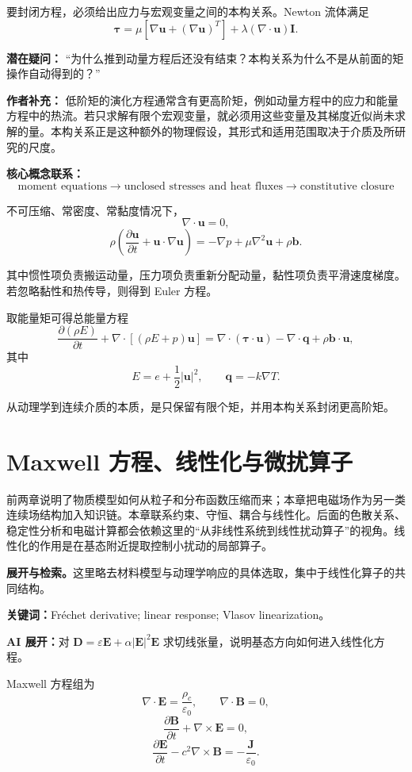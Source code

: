 \documentclass[11pt,openany]{ctexbook}
\newcommand{\studyroute}[3]{%
  \par\smallskip\noindent\textbf{展开与检索。}#1\par
  \noindent\textbf{关键词：}#2。\par
  \noindent\textbf{AI 展开：}#3\par
}
\begin{document}
要封闭方程，必须给出应力与宏观变量之间的本构关系。Newton 流体满足
\[
\bm\tau
=
\mu\left[\nabla\bm u+(\nabla\bm u)^T\right]
+\lambda(\nabla\cdot\bm u)\bm I.
\]

\begin{authornote}
\textbf{潜在疑问：}
“为什么推到动量方程后还没有结束？本构关系为什么不是从前面的矩操作自动得到的？”

\textbf{作者补充：}
低阶矩的演化方程通常含有更高阶矩，例如动量方程中的应力和能量方程中的热流。若只求解有限个宏观变量，就必须用这些变量及其梯度近似尚未求解的量。本构关系正是这种额外的物理假设，其形式和适用范围取决于介质及所研究的尺度。

\textbf{核心概念联系：}
\[
\text{moment equations}
\longrightarrow
\text{unclosed stresses and heat fluxes}
\longrightarrow
\text{constitutive closure}
\]
\end{authornote}


不可压缩、常密度、常黏度情况下，
\[
\nabla\cdot\bm u=0,
\]
\[
\rho\left(
\frac{\partial\bm u}{\partial t}
+\bm u\cdot\nabla\bm u
\right)
=
-\nabla p+\mu\nabla^2\bm u+\rho\bm b.
\]

其中惯性项负责搬运动量，压力项负责重新分配动量，黏性项负责平滑速度梯度。若忽略黏性和热传导，则得到 Euler 方程。

取能量矩可得总能量方程
\[
\frac{\partial(\rho E)}{\partial t}
+
\nabla\cdot[(\rho E+p)\bm u]
=
\nabla\cdot(\bm\tau\cdot\bm u)
-\nabla\cdot\bm q
+\rho\bm b\cdot\bm u,
\]
其中
\[
E=e+\frac12|\bm u|^2,
\qquad
\bm q=-k\nabla T.
\]

从动理学到连续介质的本质，是只保留有限个矩，并用本构关系封闭更高阶矩。

\chapter{Maxwell 方程、线性化与微扰算子}

\begin{chaptersummary}
前两章说明了物质模型如何从粒子和分布函数压缩而来；本章把电磁场作为另一类连续场结构加入知识链。本章联系约束、守恒、耦合与线性化。后面的色散关系、稳定性分析和电磁计算都会依赖这里的“从非线性系统到线性扰动算子”的视角。线性化的作用是在基态附近提取控制小扰动的局部算子。
\end{chaptersummary}
\studyroute{这里略去材料模型与动理学响应的具体选取，集中于线性化算子的共同结构。}{Fr\'echet derivative; linear response; Vlasov linearization}{对 $\bm D=\varepsilon\bm E+\alpha|\bm E|^2\bm E$ 求切线张量，说明基态方向如何进入线性化方程。}

Maxwell 方程组为
\[
\nabla\cdot\bm E=\frac{\rho_c}{\varepsilon_0},
\qquad
\nabla\cdot\bm B=0,
\]
\[
\frac{\partial\bm B}{\partial t}+\nabla\times\bm E=0,
\]
\[
\frac{\partial\bm E}{\partial t}
-c^2\nabla\times\bm B
=
-\frac{\bm J}{\varepsilon_0}.
\]
\end{document}
